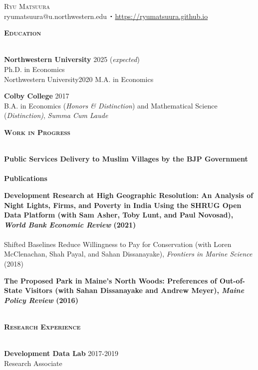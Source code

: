 \documentclass[11pt]{article}
\newcommand{\lineunder}{\vspace*{-8pt} \\ \hspace*{-18pt} \hrulefill \\}
\newcommand{\header}[1]{{\hspace*{-15pt}\vspace*{6pt} \textsc{#1}} \vspace*{-6pt} \lineunder}
\newcommand{\contact}[2]{
\begin{center}
{\LARGE \scshape {#1}}\\
#2
\end{center}
\vspace*{-8pt}
}
\newcommand{\sbt}{\,\begin{picture}(-1,1)(-1,-3)\circle*{2}\end{picture}\ }
\newcommand{\schoolwithcourses}[4]{
 \textbf{#1} \hfill{#2}\\
    #3\\
\vspace*{5pt}
}
\begin{document}

\small
\smallskip
\vspace*{-35pt}

\contact{Ryu Matsuura}
{ryumatsuura@u.northwestern.edu $\sbt$ \url{https://ryumatsuura.github.io}}

\header{\textbf{Education}}
\vspace{2mm}
\schoolwithcourses{Northwestern University}{2025 (\textit{expected})}{\hspace{2mm} Ph.D. in Economics}

\schoolwithcourses{Northwestern University}{2020}{\hspace{2mm} M.A. in Economics}

\schoolwithcourses{Colby College}{2017}{\hspace{2mm} B.A. in Economics (\textit{Honors \& Distinction}) and Mathematical Science (\textit{Distinction)}, \textit{Summa Cum Laude}}
\hfill{}

\header{\textbf{Work in Progress}}
\vspace{2mm}
\schoolwithcourses{Public Services Delivery to Muslim Villages by the BJP Government}{}{~\vspace{-3mm}}  

\header{\textbf{Publications}}
\vspace{2mm}
\schoolwithcourses{Development Research at High Geographic Resolution: An Analysis of Night Lights, Firms, and Poverty in India Using the SHRUG Open Data Platform \textnormal{(with Sam Asher, Toby Lunt, and Paul Novosad), \textit{World Bank Economic Review} (2021)}}{}{~\vspace{-3mm}}  

\schoolwithcourses{Shifted Baselines Reduce Willingness to Pay for Conservation \textnormal{(with Loren McClenachan,
Shah Payal, and Sahan Dissanayake), \textit{Frontiers in Marine Science} (2018)}}{}{~\vspace{-3mm}} 

\schoolwithcourses{The Proposed Park in Maine's North Woods: Preferences of Out-of-State Visitors \textnormal{(with Sahan Dissanayake and Andrew Meyer), \textit{Maine Policy Review} (2016)}}{}{~\vspace{-3mm}} 
\hfill{}

\header{\textbf{Research Experience}}
\vspace{2mm}
\schoolwithcourses{Development Data Lab}{2017-2019}{\hspace{2mm} Research Associate}
\hfill{}
\end{document}
